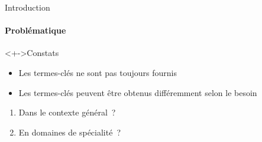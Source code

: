 \begin{frame}{Introduction}\framesubtitle{Problématique}
  \begin{alertblock}<+->{Constats}
    \begin{itemize}
      \item{Les termes-clés ne sont pas toujours fournis}
      \item{Les termes-clés peuvent être obtenus différemment selon le besoin}
    \end{itemize}
  \end{alertblock}

  \vspace{1em}

  \begin{enumerate}
    \item<+->{Dans le contexte général~?}
    \item<+->{En domaines de spécialité~?}
  \end{enumerate}

  \vspace{1em}

\end{frame}

